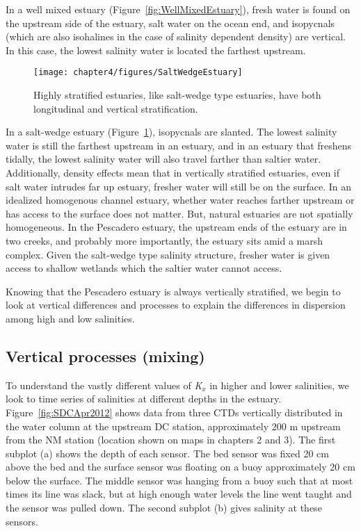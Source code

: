 In a well mixed estuary (Figure~\ref{fig:WellMixedEstuary}), fresh water is found on the upstream side of the estuary, salt water on the ocean end, and isopycnals (which are also isohalines in the case of salinity dependent density) are vertical. In this case, the lowest salinity water is located the farthest upstream. 

\begin{figure}[h]
\centering
	\texttt{[image: chapter4/figures/SaltWedgeEstuary]}
	\caption{Highly stratified estuaries, like salt-wedge type estuaries, have both longitudinal and vertical stratification.} \label{fig:SaltWedgeEstuary}
\end{figure}

In a salt-wedge estuary (Figure~\ref{fig:SaltWedgeEstuary}), isopycnals are slanted. The lowest salinity water is still the farthest upstream in an estuary, and in an estuary that freshens tidally, the lowest salinity water will also travel farther than saltier water. Additionally, density effects mean that in vertically stratified estuaries, even if salt water intrudes far up estuary, fresher water will still be on the surface. In an idealized homogenous channel estuary, whether water reaches farther upstream or has access to the surface does not matter. But, natural estuaries are not spatially homogeneous. In the Pescadero estuary, the upstream ends of the estuary are in two creeks, and probably more importantly, the estuary sits amid a marsh complex. Given the salt-wedge type salinity structure, fresher water is given access to shallow wetlands which the saltier water cannot access. 

Knowing that the Pescadero estuary is always vertically stratified, we begin to look at vertical differences and processes to explain the differences in dispersion among high and low salinities. 

\subsection{Vertical processes (mixing)}

To understand the vastly different values of \emph{K$_x$} in higher and lower salinities, we look to time series of salinities at different depths in the estuary. Figure~\ref{fig:SDCApr2012} shows data from three CTDs vertically distributed in the water column at the upstream DC station, approximately 200 m upstream from the NM station (location shown on maps in chapters 2 and 3). The first subplot (a) shows the depth of each sensor. The bed sensor was fixed 20 cm above the bed and the surface sensor was floating on a buoy approximately 20 cm below the surface. The middle sensor was hanging from a buoy such that at most times its line was slack, but at high enough water levels the line went taught and the sensor was pulled down. The second subplot (b) gives salinity at these sensors.

